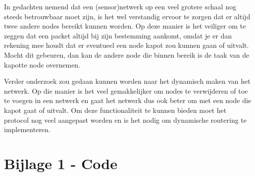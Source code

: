 \documentclass[a4paper,10pt]{article}
\begin{document}
In gedachten nemend dat een (sensor)netwerk op een veel grotere schaal nog steeds betrouwbaar moet zijn, is het wel verstandig ervoor te zorgen dat er altijd twee andere nodes bereikt kunnen worden. Op deze manier is het veiliger om te zeggen dat een packet altijd bij zijn bestemming aankomt, omdat je er dan rekening mee houdt dat er eventueel een node kapot zou kunnen gaan of uitvalt. Mocht dit gebeuren, dan kan de andere node die binnen bereik is de taak van de kapotte node overnemen.

Verder onderzoek zou gedaan kunnen worden naar het dynamisch maken van het netwerk. Op die manier is het veel gemakkelijker om nodes te verwijderen of toe te voegen in een netwerk en gaat het netwerk dus ook beter om met een node die kapot gaat of uitvalt. Om deze functionaliteit te kunnen bieden moet het protocol nog veel aangepast worden en is het nodig om dynamische routering te implementeren.

\newpage
\appendix
\section{Bijlage 1 - Code}
\label{sec:code}

\end{document}
